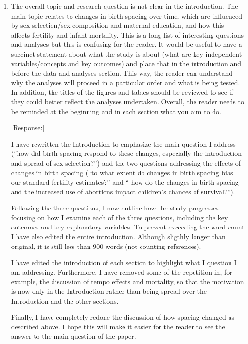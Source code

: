 \documentclass[letterpaper,12pt]{article}
\begin{document}
\begin{enumerate}

\item The overall topic and research question is not clear in the
introduction. The main topic relates to changes in birth spacing over
time, which are influenced by sex selection/sex composition and maternal
education, and how this affects fertility and infant mortality. This is
a long list of interesting questions and analyses but this is confusing
for the reader. It would be useful to have a succinct statement about
what the study is about (what are key independent variables/concepts and
key outcomes) and place that in the introduction and before the data and
analyses section. This way, the reader can understand why the analyses
will proceed in a particular order and what is being tested. In
addition, the titles of the figures and tables should be reviewed to see
if they could better reflect the analyses undertaken. Overall, the
reader needs to be reminded at the beginning and in each section what
you aim to do.

[Response:] 

I have rewritten the Introduction to emphasize the main question I address
(``how did birth spacing respond to these changes, especially the introduction and spread 
of sex selection?'') and the two questions addressing the effects of changes in 
birth spacing (``to what extent do changes in birth spacing bias our standard fertility 
estimates?'' and `` how do the changes in birth spacing and the increased use of abortions 
impact children's chances of survival?'').

Following the three questions, I now outline how the study progresses focusing on 
how I examine each of the three questions, including the key outcomes and key explanatory 
variables.
To prevent exceeding the word count I have also edited the entire introduction.
Although sligthly longer than original, it is still less than 900 words 
(not counting references).

I have edited the introduction of each section to highlight what I question
I am addressing.
Furthermore, I have removed some of the repetition in, for example, the
discussion of tempo effects and mortality, so that the motivation is now only
in the Introduction rather than being spread over the Introduction and the
other sections.

Finally, I have completely redone the discussion of how spacing changed as described
above.
I hope this will make it easier for the reader to see the answer to the main
question of the paper.


\end{enumerate}
\end{document}
